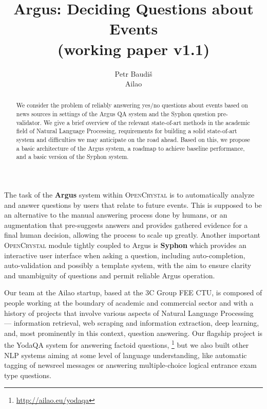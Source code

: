 \documentclass[11pt,a4paper]{article}
\title{Argus: Deciding Questions about Events \\ (working paper v1.1)}
\author{Petr Baudiš \\ Ailao}
\begin{document}
\maketitle

\begin{abstract}%
	We consider the problem of reliably answering yes/no questions
	about events based on news sources in settings of the Argus QA
	system and the Syphon question pre-validator.
	We give a brief overview of the relevant state-of-art methods
	in the academic field of Natural Language Processing,
	requirements for building a solid state-of-art system
	and difficulties we may anticipate on the road ahead.
	Based on this, we propose a basic architecture of the Argus
	system, a roadmap to achieve baseline performance, and a basic
	version of the Syphon system.
\end{abstract}

\vspace{3ex}

The task of the \textbf{Argus} system within \textsc{OpenCrystal}
is to automatically analyze and answer
questions by users that relate to future events.  This is supposed
to be an alternative to the manual answering process done by humans,
or an augmentation that pre-suggests answers and provides gathered
evidence for a final human decision, allowing the process to scale
up greatly.  Another important \textsc{OpenCrystal} module tightly
coupled to Argus is \textbf{Syphon} which provides an interactive
user interface when asking a question, including auto-completion,
auto-validation and possibly a template system, with the aim to
ensure clarity and unambiguity of questions and permit reliable
Argus operation.

Our team at the Ailao startup, based at the 3C Group FEE CTU,
is composed of people working at the boundary of academic and commercial
sector and with a history of projects that involve
various aspects of Natural Language Processing ---
information retrieval, web scraping and information extraction,
deep learning, and, most prominently in this context, question answering.
Our flagship project is the YodaQA system for answering factoid questions,%
\footnote{\url{http://ailao.eu/yodaqa}}
but we also built other NLP systems aiming at some level of language understanding,
like automatic tagging of newsreel messages
or answering multiple-choice logical entrance exam type questions.
\end{document}
